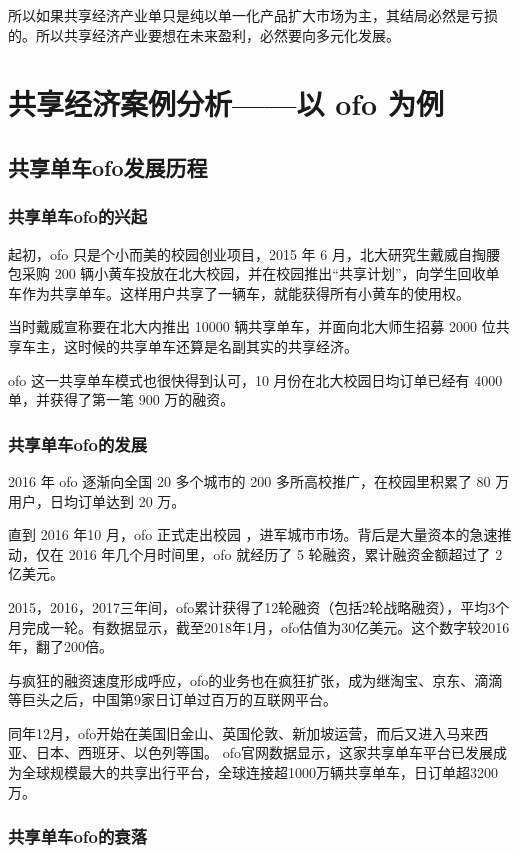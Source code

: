 \documentclass[a4paper,oneside,12pt]{article}
\begin{document}
所以如果共享经济产业单只是纯以单一化产品扩大市场为主，其结局必然是亏损的。所以共享经济产业要想在未来盈利，必然要向多元化发展。

\section{共享经济案例分析——以 ofo 为例}
\subsection{共享单车ofo发展历程}
\subsubsection{共享单车ofo的兴起}
起初，ofo 只是个小而美的校园创业项目，2015 年 6 月，北大研究生戴威自掏腰包采购 200 辆小黄车投放在北大校园，并在校园推出“共享计划”，向学生回收单车作为共享单车。这样用户共享了一辆车，就能获得所有小黄车的使用权。

当时戴威宣称要在北大内推出 10000 辆共享单车，并面向北大师生招募 2000 位共享车主，这时候的共享单车还算是名副其实的共享经济。

ofo 这一共享单车模式也很快得到认可，10 月份在北大校园日均订单已经有 4000 单，并获得了第一笔 900 万的融资。

\subsubsection{共享单车ofo的发展}
 2016 年 ofo 逐渐向全国 20 多个城市的 200 多所高校推广，在校园里积累了 80 万用户，日均订单达到 20 万。

直到 2016 年10 月，ofo 正式走出校园 ，进军城市市场。背后是大量资本的急速推动，仅在 2016 年几个月时间里，ofo 就经历了 5 轮融资，累计融资金额超过了 2 亿美元。

2015，2016，2017三年间，ofo累计获得了12轮融资（包括2轮战略融资），平均3个月完成一轮。有数据显示，截至2018年1月，ofo估值为30亿美元。这个数字较2016年，翻了200倍。

与疯狂的融资速度形成呼应，ofo的业务也在疯狂扩张，成为继淘宝、京东、滴滴等巨头之后，中国第9家日订单过百万的互联网平台。

同年12月，ofo开始在美国旧金山、英国伦敦、新加坡运营，而后又进入马来西亚、日本、西班牙、以色列等国。
ofo官网数据显示，这家共享单车平台已发展成为全球规模最大的共享出行平台，全球连接超1000万辆共享单车，日订单超3200万。

\subsubsection{共享单车ofo的衰落}
\end{document}
